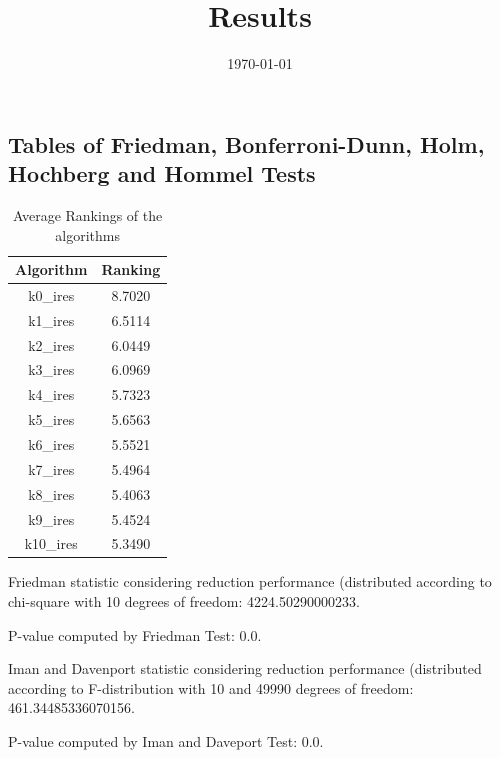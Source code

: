 \documentclass[a4paper,10pt]{article}
\title{Results}
\date{\today}
\begin{document}
\begin{landscape}
\oddsidemargin 0in \topmargin 0in\maketitle
\section{Tables of Friedman, Bonferroni-Dunn, Holm, Hochberg and Hommel Tests}
\begin{table}[!htp]
\centering
\caption{Average Rankings of the algorithms
}\begin{tabular}{c|c}
Algorithm&Ranking\\
\hline
k0_ires&8.7020\\
k1_ires&6.5114\\
k2_ires&6.0449\\
k3_ires&6.0969\\
k4_ires&5.7323\\
k5_ires&5.6563\\
k6_ires&5.5521\\
k7_ires&5.4964\\
k8_ires&5.4063\\
k9_ires&5.4524\\
k10_ires&5.3490\\
\end{tabular}
\end{table}


Friedman statistic considering reduction performance (distributed according to chi-square with 10 degrees of freedom: 4224.50290000233.


P-value computed by Friedman Test: 0.0.\newline

Iman and Davenport statistic considering reduction performance (distributed according to F-distribution with 10 and 49990 degrees of freedom: 461.34485336070156.


P-value computed by Iman and Daveport Test: 0.0.\newline


\end{landscape}
\end{document}
